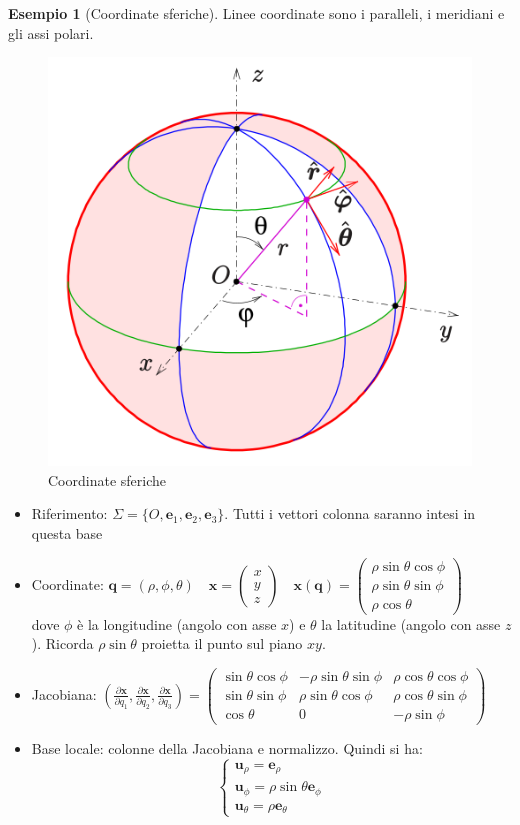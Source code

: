 \documentclass[a4paper,10pt]{article}
\theoremstyle{definition}
\newcommand{\bv}{\boldsymbol} %
\newcommand{\cvv}[3]{\begin{pmatrix} #1 \\ #2 \\ #3 \end{pmatrix}} %
\theoremstyle{indentdefinition}
\theoremstyle{indenttheorem}
\theoremstyle{myremark}
\newtheorem{example*}{Esempio}
\theoremstyle{indentgeneral}
\begin{document}
\begin{example*}[Coordinate sferiche]
      Linee coordinate sono i paralleli, i meridiani e gli assi polari.
\begin{figure}[h]
        \centering
        \includegraphics[width=0.25\linewidth]{image.png}
        \caption{Coordinate sferiche}
        \label{fig:coordinate-sferiche}
    \end{figure}
    \begin{itemize}
        \item Riferimento: $\Sigma=\{O,\bv{e}_1,\boldsymbol{e}_{2},\boldsymbol{e}_{3}\}$. Tutti i vettori colonna saranno intesi in questa base
        \item Coordinate:  $\bv{q}=(\rho,\phi,\theta) \quad \bv{x}=\cvv{x}{y}{z} \quad  \bv{x}(\bv{q})=\cvv{\rho\sin\theta\cos\phi}{\rho\sin\theta\sin\phi}{\rho\cos\theta}$ \\
dove $\phi$ è la longitudine (angolo con asse $x$) e $\theta$ la latitudine (angolo con asse $z$). Ricorda $\rho\sin\theta$ proietta il punto sul piano $xy$.
        \item Jacobiana: $\left(\frac{\partial \bv{x}}{\partial q_1},\frac{\partial \bv{x}}{\partial q_2},\frac{\partial \bv{x}}{\partial q_3}\right)=\begin{pmatrix}
            \sin\theta\cos\phi & -\rho\sin\theta\sin\phi & \rho\cos\theta\cos\phi \\
            \sin\theta\sin\phi & \rho\sin\theta\cos\phi & \rho\cos\theta\sin\phi \\
            \cos\theta & 0 & -\rho\sin\phi
        \end{pmatrix}$
        \item Base locale: colonne della Jacobiana e normalizzo. Quindi si ha:
        $$\begin{cases}
            \bv{u}_\rho=\bv{e}_\rho \\
            \bv{u}_\phi=\rho\sin\theta\bv{e}_\phi \\
            \bv{u}_\theta=\rho \bv{e}_\theta
        \end{cases}$$
   \end{itemize}
\end{example*}
\end{document}

